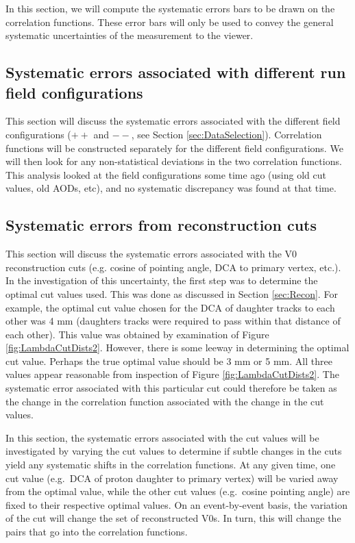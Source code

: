 In this section, we will compute the systematic errors bars to be drawn on the correlation functions.  These error bars will only be used to convey the general systematic uncertainties of the measurement to the viewer.  

\subsection{Systematic errors associated with different run field configurations}
\label{sec:SystematicsFieldConfig}

This section will discuss the systematic errors associated with the different field configurations ($++$ and $--$, see Section \ref{sec:DataSelection}).  Correlation functions will be constructed separately for the different field configurations.  We will then look for any non-statistical deviations in the two correlation functions.  This analysis looked at the field configurations some time ago (using old cut values, old AODs, etc), and no systematic discrepancy was found at that time.



\subsection{Systematic errors from reconstruction cuts}
\label{sec:SystematicsReconstruction}

This section will discuss the systematic errors associated with the V0 reconstruction cuts (e.g. cosine of pointing angle, DCA to primary vertex, etc.).  In the investigation of this uncertainty, the first step was to determine the optimal cut values used.  This was done as discussed in Section \ref{sec:Recon}.  For example, the optimal cut value chosen for the DCA of daughter tracks to each other was 4 mm (daughters tracks were required to pass within that distance of each other).  This value was obtained by examination of Figure \ref{fig:LambdaCutDists2}.  However, there is some leeway in determining the optimal cut value.  Perhaps the true optimal value should be 3 mm or 5 mm.  All three values appear reasonable from inspection of Figure \ref{fig:LambdaCutDists2}.  The systematic error associated with this particular cut could therefore be taken as the change in the correlation function associated with the change in the cut values.

In this section, the systematic errors associated with the cut values will be investigated by varying the cut values to determine if subtle changes in the cuts yield any systematic shifts in the correlation functions.  At any given time, one cut value (e.g.\ DCA of proton daughter to primary vertex) will be varied away from the optimal value, while the other cut values (e.g.\ cosine pointing angle) are fixed to their respective optimal values.  On an event-by-event basis, the variation of the cut will change the set of reconstructed V0s.  In turn, this will change the pairs that go into the correlation functions.  

